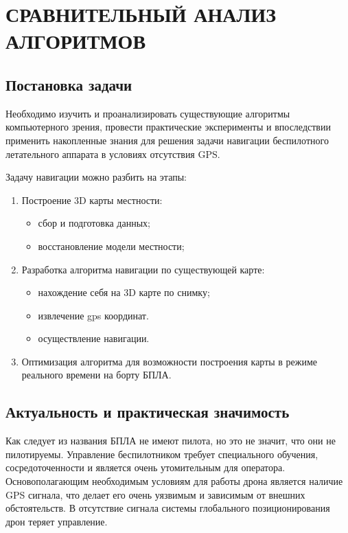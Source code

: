 \chapter{СРАВНИТЕЛЬНЫЙ АНАЛИЗ АЛГОРИТМОВ}

\section{Постановка задачи}

Необходимо изучить и проанализировать существующие алгоритмы компьютерного зрения, провести практические эксперименты и впоследствии применить накопленные знания для решения задачи навигации беспилотного летательного аппарата в условиях отсутствия GPS.

Задачу навигации можно разбить на этапы:
\begin{enumerate}
    \item Построение 3D карты местности:
        \begin{itemize}
            \item сбор и подготовка данных;
            \item восстановление модели местности;
         \end{itemize}
    \item Разработка алгоритма навигации по существующей карте:
         \begin{itemize}
            \item нахождение себя на 3D карте по снимку;
            \item извлечение gps координат.
            \item осуществление навигации.
         \end{itemize}
    \item Оптимизация алгоритма для возможности построения карты в режиме реального времени на борту БПЛА.
\end{enumerate}

\section{Актуальность и практическая значимость}

Как следует из названия БПЛА не имеют пилота, но это не значит, что они не пилотируемы. Управление беспилотником требует специального обучения, сосредоточенности и является очень утомительным для оператора. Основополагающим необходимым условиям для работы дрона является наличие GPS сигнала, что делает его очень уязвимым и зависимым от внешних обстоятельств. В отсутствие сигнала системы глобального позиционирования дрон теряет управление.

